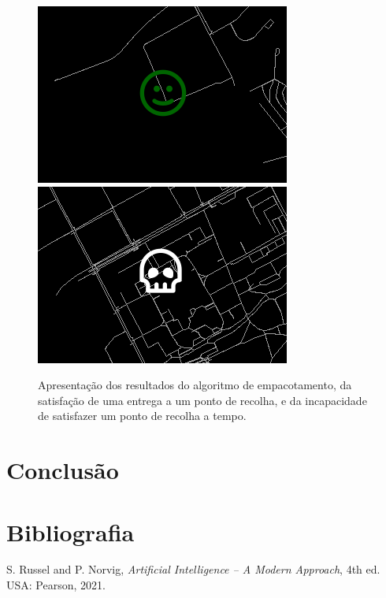 \documentclass[12pt, a4paper]{article}
\begin{document}
\begin{figure}[H]
\begin{minipage}{0.32\textwidth}
    \end{minipage}
    \begin{minipage}{0.45\textwidth}
        \includegraphics[width=\textwidth]{res/Sucesso.png}
        \includegraphics[width=\textwidth]{res/Morte.png}
    \end{minipage}
    \caption{
        Apresentação dos resultados do algoritmo de empacotamento, da satisfação de uma entrega a um
        ponto de recolha, e da incapacidade de satisfazer um ponto de recolha a tempo.
    }
\end{figure}
\section{Conclusão}

\section{Bibliografia}
\def\refname{}
\vspace{-1.5cm}
\begin{thebibliography}{9}
     S. Russel and P. Norvig, \emph{Artificial Intelligence -- A Modern Approach},
        4th ed. USA: Pearson, 2021.
\end{thebibliography}
\end{document}
